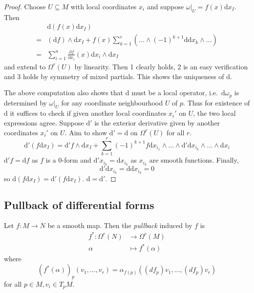 \documentclass[a4paper]{article}
\newcommand{\w}{\wedge}
\begin{document}
\begin{proof}
  Choose \(U \subseteq M\) with local coordinates \(x_i\) and suppose \(\omega|_U = f(x) \mathrm d x_I\). Then
  \begin{align*}
    &\mathrm d(f(x) \mathrm d x_I) \\
    =& (\mathrm d f) \w \mathrm d x_I + f(x) \sum_{k = 1}^r (\dots \w (-1)^{k + 1} \mathrm d \mathrm d x_k \w \dots ) \\
    =& \sum_{i = 1}^n \frac{\partial f}{\partial x_i}(x) \mathrm d x_i \w \mathrm d x_I
  \end{align*}
  and extend to \(\Omega^r(U)\) by linearity. Then 1 clearly holds, 2 is an easy verification and 3 holds by symmetry of mixed partials. This shows the uniqueness of \(\mathrm d\).

  The above computation also shows that \(\mathrm d\) must be a local operator, i.e.\ \(\mathrm d\omega_p\) is determined by \(\omega|_U\) for any coordinate neighbourhood \(U\) of \(p\). Thus for existence of \(\mathrm d\) it suffices to check if given another local coordinates \(x_i'\) on \(U\), the two local expressions agree. Suppose \(\mathrm d'\) is the exterior derivative given by another coordinates \(x_i'\) on \(U\). Aim to show \(\mathrm d' = \mathrm d\) on \(\Omega^r(U)\) for all \(r\).
  \[
    \mathrm d' (f \mathrm d x_I)
    = \mathrm d'f \w \mathrm d x_I + \sum_{k = 1}^r (-1)^{k + 1} f \mathrm d x_{i_1} \w \dots \w \mathrm d' \mathrm d x_{i_k} \w \dots \w \mathrm d x_i
  \]
  \(\mathrm d' f = \mathrm d f\) as \(f\) is a \(0\)-form and \(\mathrm d' x_{i_k} = \mathrm d x_{i_k}\) as \(x_{i_k}\) are smooth functions. Finally,
  \[
    \mathrm d' \mathrm d x_{i_k} = \mathrm d \mathrm d x_{i_k} = 0
  \]
  so \(\mathrm d (f \mathrm dx_I) = \mathrm d'(f \mathrm dx_I)\). \(\mathrm d = \mathrm d'\).
\end{proof}

\subsection{Pullback of differential forms}

\begin{definition}[pullback]
  Let \(f: M \to N\) be a smooth map. Then the \emph{pullback} induced by \(f\) is
  \begin{align*}
    f^*: \Omega^r(N) &\to \Omega^r(M) \\
    \alpha &\mapsto f^*(\alpha)
  \end{align*}
  where
  \[
    (f^*(\alpha))_p (v_1, \dots, v_r) = \alpha_{f(p)} ((df_p) v_1, \dots, (df_p)v_r)
  \]
  for all \(p \in M, v_i \in T_pM\).
\end{definition}
\end{document}
